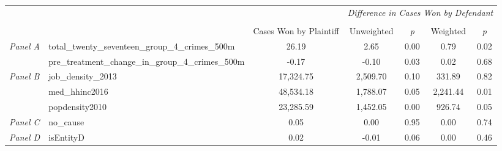 \begin{tabular}{llccccc}
\toprule
 &  & \textit{} & \multicolumn{4}{c}{\textit{Difference in Cases Won by Defendant}} \\
\cline{4-7}
\\
 &  & Cases Won by Plaintiff & Unweighted & \emph{p} & Weighted & \emph{p} \\
\midrule
\multirow[c]{2}{3cm}{\textit{Panel A}} & total_twenty_seventeen_group_4_crimes_500m & 26.19 & 2.65 & 0.00 & 0.79 & 0.02 \\
 & pre_treatment_change_in_group_4_crimes_500m & -0.17 & -0.10 & 0.03 & 0.02 & 0.68 \\
\cline{1-7}
\multirow[c]{3}{3cm}{\textit{Panel B}} & job_density_2013 & 17,324.75 & 2,509.70 & 0.10 & 331.89 & 0.82 \\
 & med_hhinc2016 & 48,534.18 & 1,788.07 & 0.05 & 2,241.44 & 0.01 \\
 & popdensity2010 & 23,285.59 & 1,452.05 & 0.00 & 926.74 & 0.05 \\
\cline{1-7}
\textit{Panel C} & no_cause & 0.05 & 0.00 & 0.95 & 0.00 & 0.74 \\
\cline{1-7}
\textit{Panel D} & isEntityD & 0.02 & -0.01 & 0.06 & 0.00 & 0.46 \\
\cline{1-7}
\bottomrule
\end{tabular}
